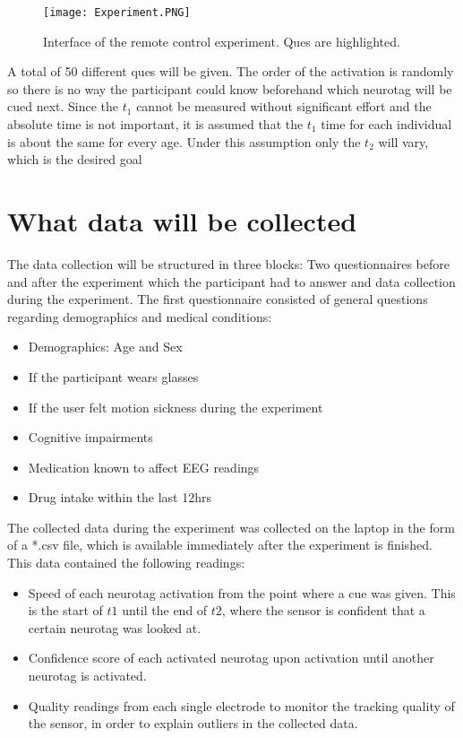            \begin{figure}[h]     %
                \centering
                \texttt{[image: Experiment.PNG]} 
                \caption{Interface of the remote control experiment. Ques are highlighted.}\label{gui-remote}
            \end{figure} 
            
            A total of 50 different ques will be given. The order of the activation is randomly so there is no way the participant could know beforehand which neurotag will be cued next. Since the $t_{1}$ cannot be measured without significant effort and the absolute time is not important, it is assumed that the $t_{1}$ time for each individual is about the same for every age. Under this assumption only the $t_{2}$ will vary, which is the desired goal

        \section{What data will be collected}\label{datacollection}

            The data collection will be structured in three blocks: Two questionnaires before and after the experiment which the participant had to answer and data collection during the experiment. The first questionnaire consisted of general questions regarding demographics and medical conditions:

            \begin{itemize}
                \item Demographics: Age and Sex
                \item If the participant wears glasses
                \item If the user felt motion sickness during the experiment
                \item Cognitive impairments
                \item Medication known to affect EEG readings
                \item Drug intake within the last 12hrs
            \end{itemize}

            The collected data during the experiment was collected on the laptop in the form of a *.csv file, which is available immediately after the experiment is finished. This data contained the following readings:

            \begin{itemize}
                \item Speed of each neurotag activation from the point where a cue was given. This is the start of $t1$ until the end of $t2$, where the sensor is confident that a certain neurotag was looked at.
                \item Confidence score of each activated neurotag upon activation until another neurotag is activated.
                \item Quality readings from each single electrode to monitor the tracking quality of the sensor, in order to explain outliers in the collected data.
            \end{itemize}
            
